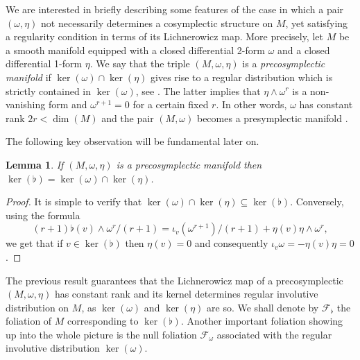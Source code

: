 \documentclass[
  a4paper, 
  reqno, 
  oneside, 
  12pt
]{amsart}
\newtheorem{lemma}[theorem]{Lemma}
\theoremstyle{definition}
\theoremstyle{remark}
\begin{document}
We are interested in briefly describing some features of the case in which a pair $(\omega,\eta)$ not necessarily determines a cosymplectic structure on $M$, yet satisfying a regularity condition in terms of its Lichnerowicz map. More precisely, let $M$ be a smooth manifold equipped with a closed differential 2-form $\omega$ and a closed differential 1-form $\eta$. We say that the triple $(M,\omega,\eta)$ is a \emph{precosymplectic manifold} if $\ker(\omega)\cap \ker(\eta)$ gives rise to a regular distribution which is strictly contained in $\ker(\omega)$, see \cite{ChineaDeLeonMarrero,GraciaDeLucasRivasRoman-Roy}. The latter implies that $\eta\wedge \omega^r$ is a non-vanishing form and $\omega^{r+1} = 0$ for a certain fixed $r$. In other words, $\omega$ has constant rank $2r< \dim(M)$ and the pair $(M,\omega)$ becomes a presymplectic manifold \cite{LinSjamaar}.

The following key observation will be fundamental later on. 

\begin{lemma}\label{Lemma1}
If $(M,\omega,\eta)$ is a precosymplectic manifold then $\ker(\flat)=\ker(\omega)\cap \ker(\eta)$.
\end{lemma}
\begin{proof}
It is simple to verify that $\ker(\omega)\cap \ker(\eta) \subseteq \ker(\flat)$. Conversely, using the formula
$$(r+1)\flat(v)\wedge \omega^r/(r+1)=\iota_v(\omega^{r+1})/(r+1)+\eta(v)\eta\wedge \omega^r,$$
we get that if $v\in\ker(\flat)$ then $\eta(v)=0$ and consequently $\iota_v\omega=-\eta(v)\eta=0$.
\end{proof}

The previous result guarantees that the Lichnerowicz map of a precosymplectic $(M,\omega,\eta)$ has constant rank and its kernel determines regular involutive distribution on $M$, as $\ker(\omega)$ and $\ker(\eta)$ are so. We shall denote by $\mathcal{F}_\flat$ the foliation of $M$ corresponding to $\ker(\flat)$. Another important foliation showing up into the whole picture is the null foliation $\mathcal{F}_\omega$ associated with the regular involutive distribution $\ker(\omega)$.
\end{document}
